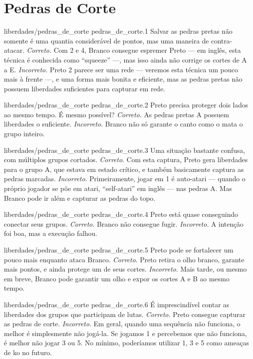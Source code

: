 \chapter{Pedras de Corte}

\emptypage

\problemAnswerDiagram
  {liberdades/pedras_de_corte}
  {pedras_de_corte.1}
  {Salvar as pedras pretas não somente é uma quantia considerável de pontos, mas uma maneira de contra-atacar.}
  {\emph{Correto.} Com 2 e 4, Branco consegue espremer Preto --- em inglês, esta técnica é conhecida como ``squeeze'' ---, mas isso ainda não corrige os cortes de A a E.}
  {\emph{Incorreto.} Preto 2 parece ser uma rede --- veremos esta técnica um pouco mais à frente ---, e uma forma mais bonita e eficiente, mas as pedras pretas não possuem liberdades suficientes para capturar em rede.}

\problemAnswerDiagram
  {liberdades/pedras_de_corte}
  {pedras_de_corte.2}
  {Preto precisa proteger dois lados ao mesmo tempo. É mesmo possível?}
  {\emph{Correto.} As pedras pretas A possuem liberdades o suficiente.}
  {\emph{Incorreto.} Branco não só garante o canto como o mata o grupo inteiro.}

\problemAnswerDiagram
  {liberdades/pedras_de_corte}
  {pedras_de_corte.3}
  {Uma situação bastante confusa, com múltiplos grupos cortados.}
  {\emph{Correto.} Com esta captura, Preto gera liberdades para o grupo A, que estava em estado crítico, e também basicamente captura as pedras marcadas.}
  {\emph{Incorreto.} Primeiramente, jogar em 1 é auto-atari --- quando o próprio jogador se põe em atari, ``self-atari'' em inglês --- nas pedras A. Mas Branco pode ir além e capturar as pedras do topo.}

\problemAnswerDiagram
  {liberdades/pedras_de_corte}
  {pedras_de_corte.4}
  {Preto está quase conseguindo conectar seus grupos.}
  {\emph{Correto.} Branco não consegue fugir.}
  {\emph{Incorreto.} A intenção foi boa, mas a execução falhou.}

\problemAnswerDiagram
  {liberdades/pedras_de_corte}
  {pedras_de_corte.5}
  {Preto pode se fortalecer um pouco mais enquanto ataca Branco.}
  {\emph{Correto.} Preto retira o olho branco, garante mais pontos, e ainda protege um de seus cortes.}
  {\emph{Incorreto.} Mais tarde, ou mesmo em breve, Branco pode garantir um olho e expor os cortes A e B ao mesmo tempo.}

\problemAnswerDiagram
  {liberdades/pedras_de_corte}
  {pedras_de_corte.6}
  {É imprescindível contar as liberdades dos grupos que participam de lutas.}
  {\emph{Correto.} Preto consegue capturar as pedras de corte.}
  {\emph{Incorreto.} Em geral, quando uma sequência não funciona, o melhor é simplesmente não jogá-la. Se jogamos 1 e percebemos que não funciona, é melhor não jogar 3 ou 5. No mínimo, poderíamos utilizar 1, 3 e 5 como ameaças de ko no futuro.}

\clearedpage
\clearedpage